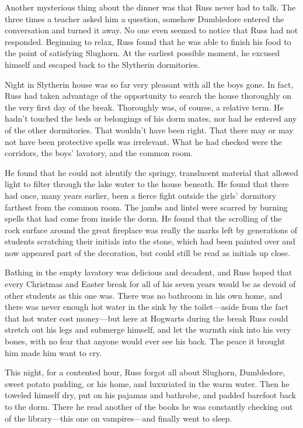 Another mysterious thing about the dinner was that Russ never had to talk. The three times a teacher asked him a question, somehow Dumbledore entered the conversation and turned it away. No one even seemed to notice that Russ had not responded. Beginning to relax, Russ found that he was able to finish his food to the point of satisfying Slughorn. At the earliest possible moment, he excused himself and escaped back to the Slytherin dormitories.

Night in Slytherin house was so far very pleasant with all the boys gone. In fact, Russ had taken advantage of the opportunity to search the house thoroughly on the very first day of the break. Thoroughly was, of course, a relative term. He hadn't touched the beds or belongings of his dorm mates, nor had he entered any of the other dormitories. That wouldn't have been right. That there may or may not have been protective spells was irrelevant. What he had checked were the corridors, the boys' lavatory, and the common room.

He found that he could not identify the springy, translucent material that allowed light to filter through the lake water to the house beneath. He found that there had once, many years earlier, been a fierce fight outside the girls' dormitory farthest from the common room. The jambs and lintel were scarred by burning spells that had come from inside the dorm. He found that the scrolling of the rock surface around the great fireplace was really the marks left by generations of students scratching their initials into the stone, which had been painted over and now appeared part of the decoration, but could still be read as initials up close.

Bathing in the empty lavatory was delicious and decadent, and Russ hoped that every Christmas and Easter break for all of his seven years would be as devoid of other students as this one was. There was no bathroom in his own home, and there was never enough hot water in the sink by the toilet—aside from the fact that hot water cost money—but here at Hogwarts during the break Russ could stretch out his legs and submerge himself, and let the warmth sink into his very bones, with no fear that anyone would ever see his back. The peace it brought him made him want to cry.

This night, for a contented hour, Russ forgot all about Slughorn, Dumbledore, sweet potato pudding, or his home, and luxuriated in the warm water. Then he toweled himself dry, put on his pajamas and bathrobe, and padded barefoot back to the dorm. There he read another of the books he was constantly checking out of the library—this one on vampires—and finally went to sleep.

